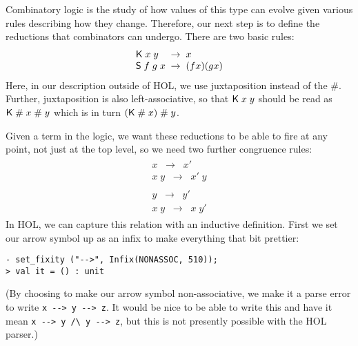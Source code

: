 \documentclass[12pt]{article}
\newcommand{\infer}[2]{\begin{array}{c}#2\\ \hline #1\end{array}}
\newcommand{\KC}{\con{K}}
\newcommand{\SC}{\con{S}}
\begin{document}
Combinatory logic is the study of how values of this type can evolve
given various rules describing how they change.  Therefore, our next
step is to define the reductions that combinators can undergo.  There
are two basic rules:
\[\begin{array}{l@{\;\;\rightarrow\;\;}l}
\KC\;x\;y & x\\
\SC\;f\;g\;x & (f x)(g x)
\end{array}\]
Here, in our description outside of HOL, we use juxtaposition instead
of the \#.  Further, juxtaposition is also left-associative, so that
${\sf K}\;x\;y$ should be read as ${\sf K}\;\#\;x\;\#\;y$ which is in
turn $({\sf K}\;\#\;x)\;\#\;y$.

Given a term in the logic, we want these reductions to be able to fire
at any point, not just at the top level, so we need two further
congruence rules:\[
\begin{array}{l}
\infer{x\;y\;\;\rightarrow\;\;x'\;y}{x\;\;\rightarrow\;\;x'}\\[5mm]
\infer{x\;y\;\;\rightarrow\;\;x\;y'}{y\;\;\rightarrow\;\;y'}
\end{array}\]
In HOL, we can capture this relation with an inductive definition.
First we set our arrow symbol up as an infix to make everything that
bit prettier:
\begin{session}\begin{verbatim}
- set_fixity ("-->", Infix(NONASSOC, 510));
> val it = () : unit
\end{verbatim}\end{session}
    (By choosing to make our arrow symbol non-associative, we make it
    a parse error to write \verb!x --> y --> z!. It would be nice to
    be able to write this and have it mean \verb!x --> y /\ y --> z!,
    but this is not presently possible with the HOL parser.)
\end{document}
